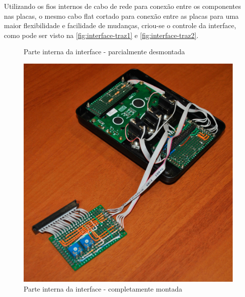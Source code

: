 \documentclass[
		12pt,				%
		openright,			%
		oneside,			%
		a4paper,			%
		chapter=TITLE,		%
		english,			%
		brazil				%
	]{abntex2}
\begin{document}
Utilizando os fios internos de cabo de rede para conexão entre os componentes nas placas, o mesmo cabo flat cortado para conexão entre as placas para uma maior flexibilidade e facilidade de mudanças, criou-se o controle da interface, como pode ser visto na \autoref{fig:interface-traz1} e \autoref{fig:interface-traz2}.

\begin{figure}[htb]
	\centering
 	\begin{minipage}{0.45\textwidth}
		\centering
		\caption{\label{fig:interface-traz1}Parte interna da interface - parcialmente desmontada}
		\includegraphics[width=1\textwidth]{img/interface-traz1.jpg}
	\end{minipage}
	\hfill
	\begin{minipage}{0.45\textwidth}
		\centering
		\caption{\label{fig:interface-traz2}Parte interna da interface - completamente montada}

\end{minipage}
\end{figure}
\end{document}
